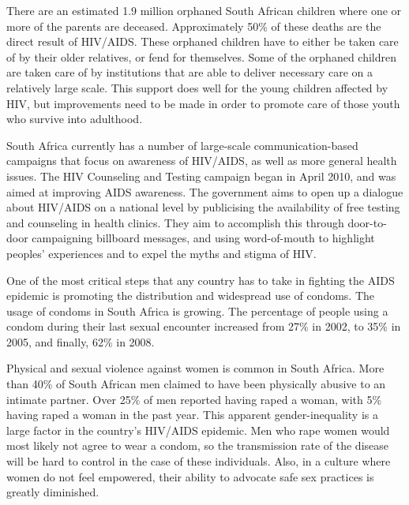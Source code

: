 \documentclass[12pt]{report}
\begin{document}
There are an estimated 1.9 million orphaned South African children where one or more of the parents are deceased.
Approximately 50\% of these deaths are the direct result of HIV/AIDS\cite{avert}.
These orphaned children have to either be taken care of by their older relatives, or fend for themselves.
Some of the orphaned children are taken care of by institutions that are able to deliver necessary care on a relatively large scale.
This support does well for the young children affected by HIV, but improvements need to be made in order to promote care of those youth who survive into adulthood.

South Africa currently has a number of large-scale communication-based campaigns that focus on awareness of HIV/AIDS, as well as more general health issues.
The HIV Counseling and Testing campaign began in April 2010, and was aimed at improving AIDS awareness.
The government aims to open up a dialogue about HIV/AIDS on a national level by publicising the availability of free testing and counseling in health clinics.
They aim to accomplish this through door-to-door campaigning billboard messages, and using word-of-mouth to highlight peoples' experiences and to expel the myths and stigma of HIV.

One of the most critical steps that any country has to take in fighting the AIDS epidemic is promoting the distribution and widespread use of condoms.
The usage of condoms in South Africa is growing.  The percentage of people using a condom during their last sexual encounter increased from 27\% in 2002, to 35\% in 2005, and finally, 62\% in 2008\cite{shisana}.

Physical and sexual violence against women is common in South Africa. 
More than 40\% of South African men claimed to have been physically abusive to an intimate partner.
Over 25\% of men reported having raped a woman, with 5\% having raped a woman in the past year\cite{avert}.
This apparent gender-inequality is a large factor in the country's HIV/AIDS epidemic.  
Men who rape women would most likely not agree to wear a condom, so the transmission rate of the disease will be hard to control in the case of these individuals.
Also, in a culture where women do not feel empowered, their ability to advocate safe sex practices is greatly diminished.
\end{document}
